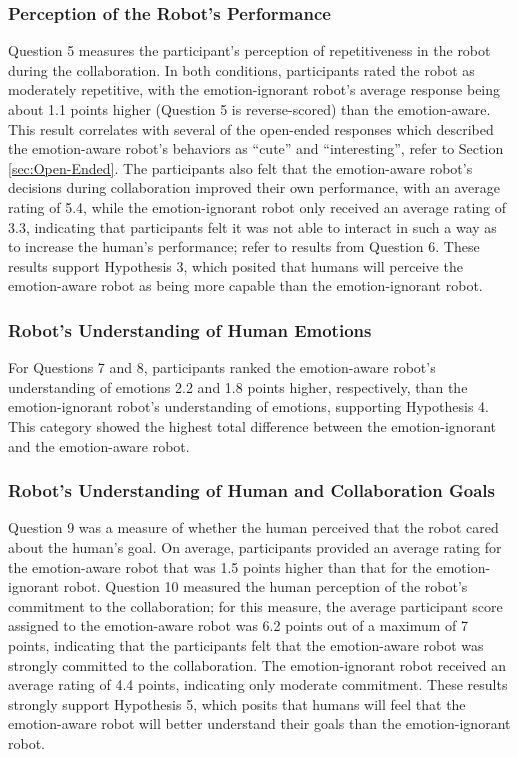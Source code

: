 \documentclass{sig-alternate-05-2015}
\begin{document}
\subsubsection{Perception of the Robot's Performance} 
\label{sec:Performance}
Question 5 measures the participant's perception of repetitiveness in the robot
during the collaboration. In both conditions, participants rated the robot as
moderately repetitive, with the emotion-ignorant robot's average response being
about 1.1 points higher (Question 5 is reverse-scored) than the emotion-aware.
This result correlates with several of the open-ended responses which described
the emotion-aware robot's behaviors as “cute” and “interesting”, refer to
Section \ref{sec:Open-Ended}. The participants also felt that the emotion-aware
robot's decisions during collaboration improved their own performance, with an
average rating of 5.4, while the emotion-ignorant robot only received an average
rating of 3.3, indicating that participants felt it was not able to interact in
such a way as to increase the human's performance; refer to results from
Question 6. These results support Hypothesis 3, which posited that humans will
perceive the emotion-aware robot as being more capable than the
emotion-ignorant robot.

\subsubsection{Robot's Understanding of Human Emotions} 
\label{sec:Emotions}
For Questions 7 and 8, participants ranked the emotion-aware robot's
understanding of emotions 2.2 and 1.8 points higher, respectively, than the
emotion-ignorant robot's understanding of emotions, supporting Hypothesis 4.
This category showed the highest total difference between the emotion-ignorant
and the emotion-aware robot.

\subsubsection{Robot's Understanding of Human and Collaboration Goals}
\label{sec:Goals}
Question 9 was a measure of whether the human perceived that the robot cared
about the human's goal. On average, participants provided an average rating for
the emotion-aware robot that was 1.5 points higher than that for the
emotion-ignorant robot. Question 10 measured the human perception of the
robot's commitment to the collaboration; for this measure, the average
participant score assigned to the emotion-aware robot was 6.2 points out of a
maximum of 7 points, indicating that the participants felt that the
emotion-aware robot was strongly committed to the collaboration. The
emotion-ignorant robot received an average rating of 4.4 points, indicating
only moderate commitment. These results strongly support Hypothesis 5, which
posits that humans will feel that the emotion-aware robot will better understand
their goals than the emotion-ignorant robot. 
\end{document}
